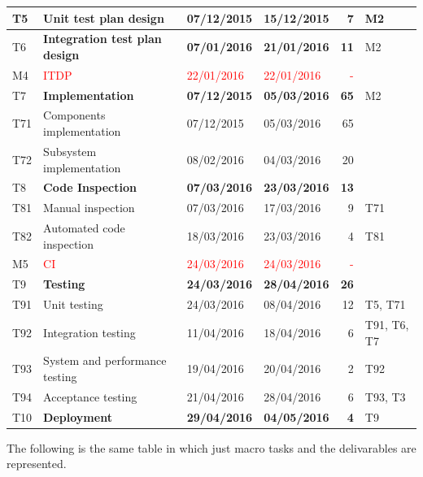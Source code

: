 \begin{center}
\begin{tabular}{l|>{\raggedright}p{4cm}|l|l|r|l}
\hline 
T5 & \textbf{Unit test plan design} & \textbf{07/12/2015} & \textbf{15/12/2015} & \textbf{7} & M2\tabularnewline
\hline 
T6 & \textbf{Integration test plan design} & \textbf{07/01/2016} & \textbf{21/01/2016} & \textbf{11} & M2\tabularnewline
\hline 
M4 & \textcolor{red}{ITDP} & \textcolor{red}{22/01/2016} & \textcolor{red}{22/01/2016} & \textcolor{red}{-} & \tabularnewline
\hline 
T7 & \textbf{Implementation} & \textbf{07/12/2015} & \textbf{05/03/2016} & \textbf{65} & M2\tabularnewline
\hline 
T71 & {\footnotesize{}Components implementation} & {\footnotesize{}07/12/2015} & {\footnotesize{}05/03/2016} & {\footnotesize{}65} & \tabularnewline
\hline 
T72 & {\footnotesize{}Subsystem implementation} & {\footnotesize{}08/02/2016} & {\footnotesize{}04/03/2016} & {\footnotesize{}20} & \tabularnewline
\hline 
T8 & \textbf{Code Inspection} & \textbf{07/03/2016} & \textbf{23/03/2016} & \textbf{13} & \tabularnewline
\hline 
T81 & {\footnotesize{}Manual inspection} & {\footnotesize{}07/03/2016} & {\footnotesize{}17/03/2016} & {\footnotesize{}9} & T71\tabularnewline
\hline 
T82 & {\footnotesize{}Automated code inspection} & {\footnotesize{}18/03/2016} & {\footnotesize{}23/03/2016} & {\footnotesize{}4} & T81\tabularnewline
\hline 
M5 & \textcolor{red}{CI} & \textcolor{red}{24/03/2016} & \textcolor{red}{24/03/2016} & \textcolor{red}{-} & \tabularnewline
\hline 
T9 & \textbf{Testing} & \textbf{24/03/2016} & \textbf{28/04/2016} & \textbf{26} & \tabularnewline
\hline 
T91 & {\footnotesize{}Unit testing} & {\footnotesize{}24/03/2016} & {\footnotesize{}08/04/2016} & {\footnotesize{}12} & T5, T71\tabularnewline
\hline 
T92 & {\footnotesize{}Integration testing} & {\footnotesize{}11/04/2016} & {\footnotesize{}18/04/2016} & {\footnotesize{}6} & T91, T6, T7\tabularnewline
\hline 
T93 & {\footnotesize{}System and performance testing} & {\footnotesize{}19/04/2016} & {\footnotesize{}20/04/2016} & {\footnotesize{}2} & T92\tabularnewline
\hline 
T94 & {\footnotesize{}Acceptance testing} & {\footnotesize{}21/04/2016} & {\footnotesize{}28/04/2016} & {\footnotesize{}6} & T93, T3\tabularnewline
\hline 
T10 & \textbf{Deployment} & \textbf{29/04/2016} & \textbf{04/05/2016} & \textbf{4} & T9\tabularnewline
\hline 
\end{tabular}
\par\end{center}

\medskip{}


\newpage{}

The following is the same table in which just macro tasks and the
delivarables are represented.

